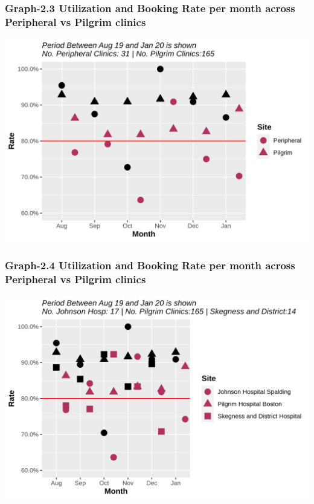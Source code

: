 \documentclass[]{article}
\begin{document}
\hypertarget{graph-2.3-utilization-and-booking-rate-per-month-across-peripheral-vs-pilgrim-clinics}{%
\subsubsection{Graph-2.3 Utilization and Booking Rate per month across
Peripheral vs Pilgrim
clinics}\label{graph-2.3-utilization-and-booking-rate-per-month-across-peripheral-vs-pilgrim-clinics}}

\begin{center}\includegraphics{LF2_files/figure-latex/unnamed-chunk-8-1} \end{center}

\hypertarget{graph-2.4-utilization-and-booking-rate-per-month-across-peripheral-vs-pilgrim-clinics}{%
\subsubsection{Graph-2.4 Utilization and Booking Rate per month across
Peripheral vs Pilgrim
clinics}\label{graph-2.4-utilization-and-booking-rate-per-month-across-peripheral-vs-pilgrim-clinics}}

\begin{center}\includegraphics{LF2_files/figure-latex/unnamed-chunk-9-1} \end{center}
\end{document}
